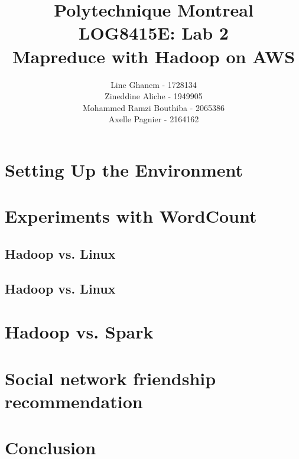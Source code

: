 \documentclass[12pt]{article}
\title{Polytechnique Montreal \\
LOG8415E: Lab 2\\
Mapreduce with Hadoop on AWS}
\author{Line Ghanem - 1728134\\Zineddine Aliche - 1949905\\
Mohammed Ramzi Bouthiba - 2065386\\Axelle Pagnier - 2164162}
\begin{document}
\maketitle

\begin{abstract}

\end{abstract}

\section{Setting Up the Environment}


\section{Experiments with WordCount}
\subsection{Hadoop vs. Linux}

 
\subsection{Hadoop vs. Linux}
\section{Hadoop vs. Spark}


\section{Social network friendship recommendation}

\section{Conclusion}



\begin{thebibliography}{9}
 
\end{thebibliography}
\end{document}
